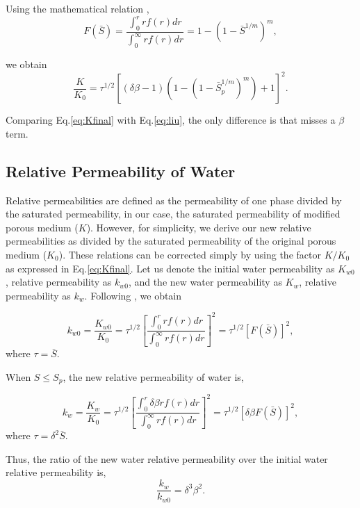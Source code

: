 \documentclass[preprint,12pt,authoryear]{elsarticle}
\begin{document}
Using the mathematical relation \citep{van1980closed},
\begin{equation}
F(\bar{S})=\dfrac{\int_0^r rf(r)dr}{\int_0^\infty rf(r)dr}=1-(1-\bar{S}^{1/m})^m,
\end{equation}

we obtain
\begin{equation}
\label{eq:Kfinal}
\dfrac{K}{K_0}=\tau^{1/2}[(\delta\beta-1)(1-(1-\bar{S}_p^{1/m})^m)+1]^2.
\end{equation}

Comparing Eq.\ref{eq:Kfinal} with Eq.\ref{eq:liu}, the only difference is that \cite{liu2013permeability} misses a $\beta$ term.

\subsection{Relative Permeability of Water}
Relative permeabilities are defined as the permeability of one phase divided by the saturated permeability, in our case, the saturated permeability of modified porous medium ($K$). However, for simplicity, we derive our new relative permeabilities as divided by the saturated permeability of the original porous medium ($K_0$). These relations can be corrected simply by using the factor $K/K_0$ as expressed in Eq.\ref{eq:Kfinal}. Let us denote the initial water permeability as $K_{w0}$, relative permeability as $k_{w0}$, and the new water permeability as $K_w$, relative permeability as $k_w$. Following \cite{mualem1976new}, we obtain


\begin{equation}
k_{w0}=\dfrac{K_{w0}}{K_0}=\tau^{1/2}[\dfrac{\int_0^r rf(r)dr}{\int_0^{\infty} rf(r)dr}]^2=\tau^{1/2}[F(\bar{S})]^2,
\end{equation} 
where $\tau=\bar{S}$.

When $S\leq S_p$, the new relative permeability of water is,

\begin{equation}
k_w=\dfrac{K_w}{K_0}=\tau^{1/2}[\dfrac{\int_0^r \delta\beta rf(r)dr}{\int_0^{\infty} rf(r)dr}]^2=\tau^{1/2}[\delta\beta F(\bar{S})]^2,
\end{equation} 
where $\tau=\delta^2 \bar{S}$.

Thus, the ratio of the new water relative permeability over the initial water relative permeability is,
\begin{equation}
\dfrac{k_w}{k_{w0}}=\delta^3\beta^2 .
\end{equation}
\end{document}
